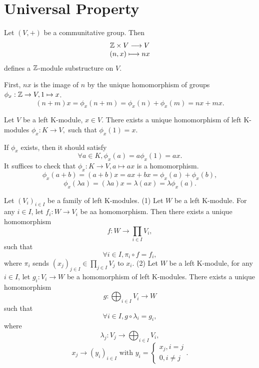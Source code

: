 \documentclass{book}
\numberwithin{equation}{section}
\begin{document}
\section{Universal Property}
\begin{propositionenv}
    Let $(V, +)$ be a communitative group. Then 
    $$\begin{matrix}
        \mathbb{Z}\times V\longrightarrow V\\
        (n, x)\longmapsto nx
    \end{matrix}$$
    defines a $\mathbb{Z}$-module substructure on $V$.
\end{propositionenv}
\begin{proofenv}
    First,  $nx$ is the image of $n$ by the unique homomorphism of groups $\phi_x:\mathbb{Z}\rightarrow V, 1\mapsto x$.
    $$(n+m)x=\phi_x(n+m)=\phi_x(n)+\phi_x(m)=nx+mx.$$
\end{proofenv}
\begin{propositionenv}
    Let $V$ be a left K-module,  $x\in V$. There exists a unique homomorphism of left K-modules 
    $\phi_x:K\longrightarrow V, $
    such that $\phi_x(1)=x$.
\end{propositionenv}
\begin{proofenv}
    If $\phi_x$ exists,  then it should satisfy 
    $$\forall a\in K, \phi_x(a)=a\phi_x(1)=ax.$$
    It suffices to check that $\phi_x:K\rightarrow V, a\mapsto ax$ is a homomorphism.
    $$\phi_x(a+b)=(a+b)x=ax+bx=\phi_x(a)+\phi_x(b), $$
    $$\phi_x(\lambda a)=(\lambda a)x=\lambda(ax)=\lambda\phi_x(a).$$
\end{proofenv}
\begin{propositionenv}
    Let $(V_i)_{i\in I}$ be a family of left K-modules.
    \newline
    (1) Let $W$ be a left K-module. For any $i\in I$,  let $f_i:W\rightarrow V_i$ be aa homomorphism. Then there exists a unique homomorphism 
    $$f:W\longrightarrow \prod_{i\in I}V_i, $$ 
    such that 
    $$\forall i\in I, \pi_i\circ f=f_i, $$
    where $\pi_i$ sends $(x_j)_{j\in I}\in \prod_{j\in I}V_j$ to $x_i$.
    \newline
    (2) Let $W$ be a left K-module,  for any $i\in I$,  let $g_i:V_i\rightarrow W$ be a homomorphism of left K-modules. There exists a unique homomorphism
    $$g:\bigoplus_{i\in I}V_i\longrightarrow W$$
    such that 
    $$\forall i\in I,  g\circ\lambda_i=g_i, $$
    where
    $$\lambda_j:V_j\longrightarrow\bigoplus_{i\in I}V_i, $$
    $$x_j\longrightarrow (y_i)_{i\in I} \text{ with } y_i=\left\{\begin{matrix}
        x_j, i=j\\0, i\not=j
    \end{matrix}\right. .$$
\end{propositionenv}
\end{document}
